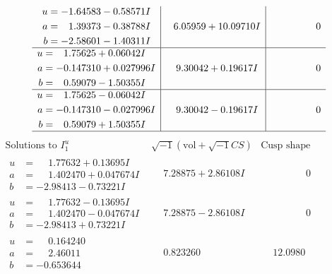 \documentclass[1p]{elsarticle_modified}
\theoremstyle{definition}
\newcommand{\I}{\sqrt{-1}}
\begin{document}
$$\begin{array}{c|c|c}
\begin{aligned}
u &= -1.64583 - 0.58571 I \\
a &= \phantom{-}1.39373 - 0.38788 I \\
b &= -2.58601 - 1.40311 I\end{aligned}
 & \phantom{-}6.05959 + 10.09710 I & \phantom{-0.000000 } 0 \\ \hline\begin{aligned}
u &= \phantom{-}1.75625 + 0.06042 I \\
a &= -0.147310 + 0.027996 I \\
b &= \phantom{-}0.59079 - 1.50355 I\end{aligned}
 & \phantom{-}9.30042 + 0.19617 I & \phantom{-0.000000 } 0 \\ \hline\begin{aligned}
u &= \phantom{-}1.75625 - 0.06042 I \\
a &= -0.147310 - 0.027996 I \\
b &= \phantom{-}0.59079 + 1.50355 I\end{aligned}
 & \phantom{-}9.30042 - 0.19617 I & \phantom{-0.000000 } 0\\
 \hline 
 \end{array}$$\newpage$$\begin{array}{c|c|c}  
\text{Solutions to }I^u_{1}& \I (\text{vol} + \sqrt{-1}CS) & \text{Cusp shape}\\
 \hline 
\begin{aligned}
u &= \phantom{-}1.77632 + 0.13695 I \\
a &= \phantom{-}1.402470 + 0.047674 I \\
b &= -2.98413 - 0.73221 I\end{aligned}
 & \phantom{-}7.28875 + 2.86108 I & \phantom{-0.000000 } 0 \\ \hline\begin{aligned}
u &= \phantom{-}1.77632 - 0.13695 I \\
a &= \phantom{-}1.402470 - 0.047674 I \\
b &= -2.98413 + 0.73221 I\end{aligned}
 & \phantom{-}7.28875 - 2.86108 I & \phantom{-0.000000 } 0 \\ \hline\begin{aligned}
u &= \phantom{-}0.164240\phantom{ +0.000000I} \\
a &= \phantom{-}2.46011\phantom{ +0.000000I} \\
b &= -0.653644\phantom{ +0.000000I}\end{aligned}
 & \phantom{-}0.823260\phantom{ +0.000000I} & \phantom{-}12.0980\phantom{ +0.000000I} \\ \hline\begin{aligned}

\end{aligned}
\end{array}$$
\end{document}
